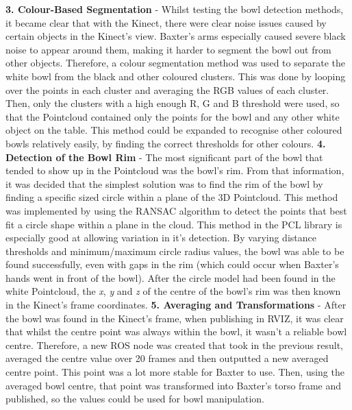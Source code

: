 \newline\newline
\textbf{3. Colour-Based Segmentation} - 
Whilst testing the bowl detection methods, it became clear that with the Kinect, there were clear noise issues caused by certain objects in the Kinect's view. Baxter's arms especially caused severe black noise to appear around them, making it harder to segment the bowl out from other objects. Therefore, a colour segmentation method was used to separate the white bowl from the black and other coloured clusters. This was done by looping over the points in each cluster and averaging the RGB values of each cluster. Then, only the clusters with a high enough R, G and B threshold were used, so that the Pointcloud contained only the points for the bowl and any other white object on the table. This method could be expanded to recognise other coloured bowls relatively easily, by finding the correct thresholds for other colours.
\newline\newline
\textbf{4. Detection of the Bowl Rim} - 
The most significant part of the bowl that tended to show up in the Pointcloud was the bowl's rim. From that information, it was decided that the simplest solution was to find the rim of the bowl by finding a specific sized circle within a plane of the 3D Pointcloud. This method was implemented by using the RANSAC algorithm to detect the points that best fit a circle shape within a plane in the cloud. This method in the PCL library is especially good at allowing variation in it's detection. By varying distance thresholds and minimum/maximum circle radius values, the bowl was able to be found successfully, even with gaps in the rim (which could occur when Baxter's hands went in front of the bowl). After the circle model had been found in the white Pointcloud, the \textit{x}, \textit{y} and \textit{z} of the centre of the bowl's rim was then known in the Kinect's frame coordinates.
\newline\newline
\textbf{5. Averaging and Transformations} - 
After the bowl was found in the Kinect's frame, when publishing in RVIZ, it was clear that whilst the centre point was always within the bowl, it wasn't a reliable bowl centre. Therefore, a new ROS node was created that took in the previous result, averaged the centre value over 20 frames and then outputted a new averaged centre point. This point was a lot more stable for Baxter to use. Then, using the averaged bowl centre, that point was transformed into Baxter's torso frame and published, so the values could be used for bowl manipulation.
